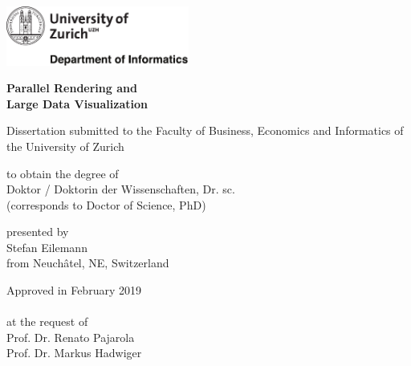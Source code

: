 

\begin{titlepage}

\setlength{\parindent}{0pt} %

\includegraphics[width=6cm]{front/images/uzhlogo.pdf}

\vspace{-2.25cm}

\begingroup
{}

\vspace{-0.75cm}
\Large
\textbf{Parallel Rendering and\\Large Data Visualization}

\vspace{0.70cm}

\normalsize
Dissertation submitted to the Faculty of Business, Economics and Informatics of the University of Zurich\\

\vspace{0.70cm}

to obtain the degree of\\
Doktor / Doktorin der Wissenschaften, Dr. sc.\\
(corresponds to Doctor of Science, PhD)

\vspace{0.70cm}

presented by\\
Stefan Eilemann\\
from Neuch\^atel, NE, Switzerland

\vspace{3.7cm}

Approved in February 2019 \\
\\
at the request of\\
Prof. Dr. Renato Pajarola\\
Prof. Dr. Markus Hadwiger

\vspace{2.2cm}

\endgroup

\end{titlepage}
